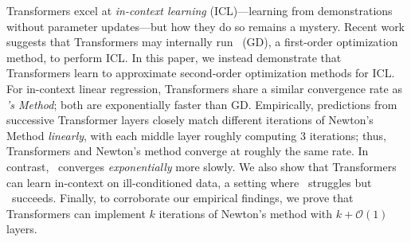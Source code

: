 Transformers excel at \textit{in-context learning} (ICL)---learning from demonstrations without parameter updates---but how they do so remains a mystery. 
Recent work suggests that Transformers may internally run \gd\ (GD), a first-order optimization method, to perform ICL.
In this paper, we instead demonstrate that Transformers learn to approximate second-order optimization methods for ICL.
For in-context linear regression, Transformers share a similar convergence rate as \textit{\newton's Method}; both are exponentially faster than GD.
Empirically, predictions from successive Transformer layers closely match different iterations of Newton's Method \textit{linearly}, with each middle layer roughly computing 3 iterations; thus, Transformers and Newton's method converge at roughly the same rate. 
In contrast, \gd\ converges \textit{exponentially} more slowly.
We also show that Transformers can learn in-context on ill-conditioned data, a setting where \gd\ struggles but \newton\ succeeds. 
Finally, to corroborate our empirical findings, we prove that Transformers can implement $k$ iterations of Newton's method with $k + \mathcal{O}(1)$ layers.
